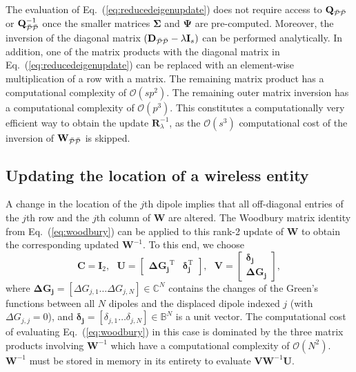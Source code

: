 \documentclass[journal,12pt,onecolumn,draftclsnofoot]{IEEEtran}
\begin{document}
The evaluation of Eq.~(\ref{eq:reducedeigenupdate}) does not require access to $\mathbf{Q}_{\mathcal{\Bar{P}\Bar{P}}}$ or $\mathbf{Q}_{\mathcal{\Bar{P}\Bar{P}}}^{-1}$ once the smaller matrices $\mathbf{\Sigma}$ and $\mathbf{\Psi}$ are pre-computed. Moreover, the inversion of the diagonal matrix $\left(\mathbf{D}_{\mathcal{\Bar{P}\Bar{P}}}-\lambda \mathbf{I}_s\right)$ can be performed analytically. In addition, one of the matrix products with the diagonal matrix in Eq.~(\ref{eq:reducedeigenupdate}) can be replaced with an element-wise multiplication of a row with a matrix. The remaining matrix product has a computational complexity of $\mathcal{O}\left(sp^2\right)$. The remaining outer matrix inversion has a computational complexity of $\mathcal{O}\left(p^3\right)$. This constitutes a computationally very efficient way to obtain the update $\mathbf{R}^{-1}_{\lambda}$, as the $\mathcal{O}\left(s^3\right)$ computational cost of the inversion of $\mathbf{W}_{\mathcal{\Bar{P}\Bar{P}}}$ is skipped.












\subsection{Updating the location of a wireless entity}\label{subsec_MovingUE}

A change in the location of the $j$th dipole implies that all off-diagonal entries of the $j$th row and the $j$th column of $\mathbf{W}$ are altered. The Woodbury matrix identity from Eq.~(\ref{eq:woodbury}) can be applied to this rank-2 update of $\mathbf{W}$ to obtain the corresponding updated $\mathbf{W}^{-1}$.
To this end, we choose
\begin{equation}
\mathbf{C}=\mathbf{I}_2,\ \ \ 
\mathbf{U}=\left[\begin{array}{cc} \mathbf{\Delta G_{j}}^{\mathrm{T}} & \boldsymbol{\delta}_\mathbf{j}^{\mathrm{T}}\end{array}\right],\ \ \ 
\mathbf{V}=\left[\begin{array}{c} \boldsymbol{\delta}_\mathbf{j} \\ \mathbf{\Delta G_{j}}\end{array}\right],
\end{equation}
where $\mathbf{\Delta G_{j}}=[\Delta G_{j,1} \dots \Delta G_{j,N}] \in \mathbb{C}^{N}$ contains the changes of the Green's functions between all $N$ dipoles and the displaced
dipole indexed $j$ (with $\Delta G_{j,j}=0$), and $\boldsymbol{\delta}_\mathbf{j}=[\delta_{j,1} \dots \delta_{j,N}]  \in \mathbb{B}^{N}$ is a unit vector.
The computational cost of evaluating Eq.~(\ref{eq:woodbury}) in this case is dominated by the three matrix products involving $\mathbf{W}^{-1}$ which have a computational complexity of $\mathcal{O}\left(N^2\right)$. 
$\mathbf{W}^{-1}$ must be stored in memory in its entirety to evaluate $\mathbf{VW}^{-1}\mathbf{U}$.
\end{document}
